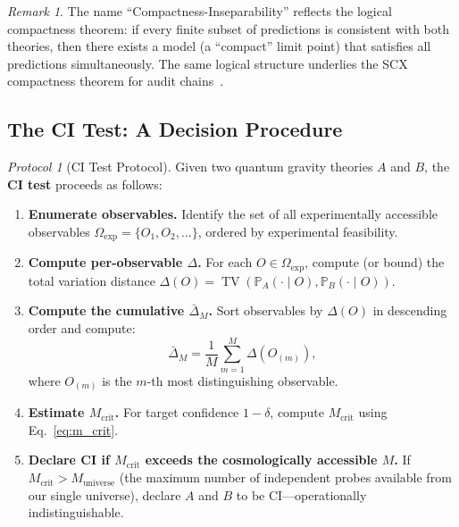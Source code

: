 \documentclass[12pt,a4paper]{article}
\theoremstyle{remark}
\newtheorem{remark}[theorem]{Remark}
\newtheorem{protocol}[theorem]{Protocol}
\newcommand{\Pbb}{\mathbb{P}}
\newcommand{\SCX}{\textsf{SCX}}
\newcommand{\CI}{\textsf{CI}}
\DeclareMathOperator{\TV}{TV}
\begin{document}
\begin{remark}
\label{rem:compactness_name}
The name ``Compactness-Inseparability'' reflects the logical compactness theorem: if every finite subset of predictions is consistent with both theories, then there exists a model (a ``compact'' limit point) that satisfies all predictions simultaneously. The same logical structure underlies the \SCX{} compactness theorem for audit chains~\cite{scx_compactness}.
\end{remark}

\subsection{The CI Test: A Decision Procedure}

\begin{protocol}[CI Test Protocol]
\label{prot:ci_test}
Given two quantum gravity theories $A$ and $B$, the \textbf{CI test} proceeds as follows:
\begin{enumerate}[leftmargin=*, label=\textbf{Step \arabic*:}]
  \item \textbf{Enumerate observables.} Identify the set of all experimentally accessible observables $\Omega_{\text{exp}} = \{O_1, O_2, \ldots\}$, ordered by experimental feasibility.
  \item \textbf{Compute per-observable $\Delta$.} For each $O \in \Omega_{\text{exp}}$, compute (or bound) the total variation distance $\Delta(O) = \TV(\Pbb_A(\cdot \mid O), \Pbb_B(\cdot \mid O))$.
  \item \textbf{Compute the cumulative $\bar{\Delta}_M$.} Sort observables by $\Delta(O)$ in descending order and compute:
  \begin{equation}
    \bar{\Delta}_M = \frac{1}{M} \sum_{m=1}^{M} \Delta(O_{(m)}),
  \end{equation}
  where $O_{(m)}$ is the $m$-th most distinguishing observable.
  \item \textbf{Estimate $M_{\text{crit}}$.} For target confidence $1-\delta$, compute $M_{\text{crit}}$ using Eq.~\eqref{eq:m_crit}.
  \item \textbf{Declare \CI{} if $M_{\text{crit}}$ exceeds the cosmologically accessible $M$.} If $M_{\text{crit}} > M_{\text{universe}}$ (the maximum number of independent probes available from our single universe), declare $A$ and $B$ to be \CI{}---operationally indistinguishable.
\end{enumerate}
\end{protocol}
\end{document}
